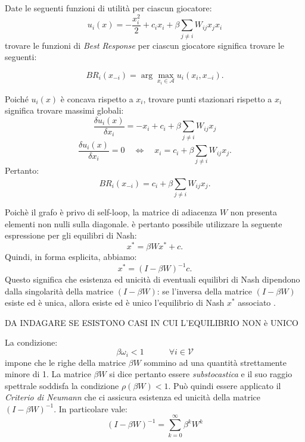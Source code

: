 \begin{alphaparts}
   \questionpart
   Date le seguenti funzioni di utilità per ciascun giocatore:
   \[
    u_i(x)=- \frac{x_i^2}{2}+ c_i x_i + \beta \sum\limits_{j \neq i} W_{ij}x_j x_i 
    \]
    trovare le funzioni di \textit{Best Response} per ciascun giocatore significa trovare le seguenti:

    \[BR_i(x_{ - i}) = \arg\max_{x_i \in \mathcal{A}} u_i(x_i, x_{ - i}).\]

    Poiché \(u_i(x)\) è concava rispetto a \(x_i\), trovare punti stazionari rispetto a \(x_i\) significa trovare massimi globali:
    \[
        \frac{\delta u_i ( x )}{\delta x_i} = -x_i + c_i + \beta  \sum \limits_{j \neq i}^{} W_{ij} x_j
    \]
    \[
        \frac{\delta u_i ( x )}{\delta x_i} = 0 \quad \iff \quad x_i = c_i + \beta  \sum \limits_{j \neq i}^{} W_{ij} x_j
    .\]
    Pertanto:
    \[
        BR_i(x_{-i}) = c_i + \beta  \sum \limits_{j \neq i}^{} W_{ij}x_j 
    .\]

    \questionpart
    Poichè il grafo è privo di self-loop, la matrice di adiacenza \(W\) non presenta elementi non nulli sulla diagonale. è pertanto possibile utilizzare la seguente espressione per gli equilibri di Nash:
    \begin{equation}\label{eq_nash}
        x^* = \beta W x^* + c
    .\end{equation}
    Quindi, in forma esplicita, abbiamo:
    \begin{equation*}
        x^* = (I -\beta W)^{-1} c
    .\end{equation*}
    Questo significa che esistenza ed unicità di eventuali equilibri di Nash dipendono dalla singolarità della matrice \((I - \beta W)\): se l'inversa della matrice \((I - \beta W)\) esiste ed è unica, allora esiste ed è unico l'equilibrio di Nash \(x^*\) associato .

    DA INDAGARE SE ESISTONO CASI IN CUI L'EQUILIBRIO NON è UNICO

    La condizione:
    \begin{equation}\label{eq_condition_beta}
        \beta \omega_i < 1 \quad \quad \quad \forall i \in \mathcal{V}
    \end{equation}
    impone che le righe della matrice \(\beta W\) sommino ad una quantità strettamente minore di 1. La matrice \(\beta W\) si dice pertanto essere \textit{substocastica} e il suo raggio spettrale soddisfa la condizione \(\rho(\beta W) < 1\). Può quindi essere applicato il \textit{Criterio di Neumann} che ci assicura esistenza ed unicità della matrice \((I - \beta W)^{-1}\). In particolare vale:
    \begin{equation}
        (I-\beta W)^{-1} =  \sum \limits_{k=0}^{\infty} \beta^k W^k
    \end{equation}


\end{alphaparts}
